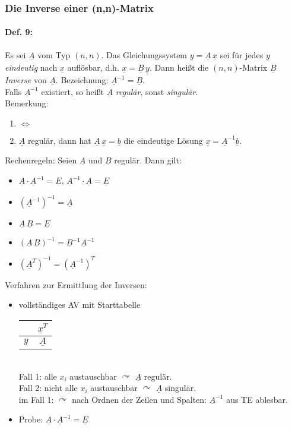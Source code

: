 \subsubsection{Die Inverse einer (n,n)-Matrix}
\paragraph{Def. 9:} \parskp
Es sei $\underline{A}$ vom Typ $(n,n)$. Das Gleichungssystem $\underline{y}=\underline{A}\,\underline{x}$ sei für jedes $\underline{y}$ \emph{eindeutig} nach $\underline{x}$ auflösbar, d.h. $\underline{x}=\underline{B}\,\underline{y}$. Dann heißt die $(n,n)$-Matrix $\underline{B}$ \emph{Inverse} von $\underline{A}$. Bezeichnung: $\underline{A}^{-1}=\underline{B}$.\\
Falls $\underline{A}^{-1}$ existiert, so heißt $\underline{A}$ \emph{regulär}, sonst \emph{singulär}.\\
Bemerkung:
\begin{enumerate}
\item {} $\Leftrightarrow$ 
\item $\underline{A}$ regulär, dann hat $\underline{A}\, \underline{x}=\underline{b}$ die eindeutige Lösung $\boxed{\underline{x}=\underline{A}^{-1}\underline{b}}$.
\end{enumerate}
Rechenregeln: Seien $\underline{A}$ und $\underline{B}$ regulär. Dann gilt:
\begin{itemize}
\item $\underline{A}\cdot \underline{A}^{-1}=\underline{E}$, $\underline{A}^{-1}\cdot \underline{A}= \underline{E}$
\item $\left(\underline{A}^{-1}\right)^{-1}=\underline{A}$
\item $\underline{A}\,\underline{B}=\underline{E}$
\item $(\underline{A}\,\underline{B})^{-1}=\underline{B}^{-1}\underline{A}^{-1}$
\item $\left(\underline{A}^T\right)^{-1}=\left(\underline{A}^{-1}\right)^T$
\end{itemize}
Verfahren zur Ermittlung der Inversen:
\begin{itemize}
\item vollständiges AV mit Starttabelle \begin{tabular}{r | c}
& $\underline{x}^T$\\
\hline
$y$ & $\underline{A}$
\end{tabular}\\
Fall 1: alle $x_i$ austauschbar $\curvearrowright$ $\underline{A}$ regulär.\\
Fall 2: nicht alle $x_i$ austauschbar $\curvearrowright$ $\underline{A}$ singulär. \\
im Fall 1: $\curvearrowright$ nach Ordnen der Zeilen und Spalten: $\underline{A}^{-1}$ aus TE ablesbar.
\item Probe: $\underline{A}\cdot \underline{A}^{-1}=\underline{E}$
\end{itemize}
